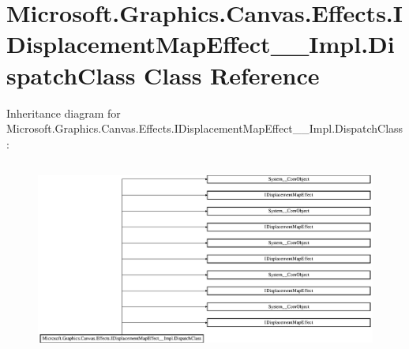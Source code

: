 \hypertarget{class_microsoft_1_1_graphics_1_1_canvas_1_1_effects_1_1_i_displacement_map_effect_____impl_1_1_dispatch_class}{}\section{Microsoft.\+Graphics.\+Canvas.\+Effects.\+I\+Displacement\+Map\+Effect\+\_\+\+\_\+\+Impl.\+Dispatch\+Class Class Reference}
\label{class_microsoft_1_1_graphics_1_1_canvas_1_1_effects_1_1_i_displacement_map_effect_____impl_1_1_dispatch_class}
Inheritance diagram for Microsoft.\+Graphics.\+Canvas.\+Effects.\+I\+Displacement\+Map\+Effect\+\_\+\+\_\+\+Impl.\+Dispatch\+Class\+:\begin{figure}[H]
\begin{center}
\leavevmode
\includegraphics[height=6.443515cm]{class_microsoft_1_1_graphics_1_1_canvas_1_1_effects_1_1_i_displacement_map_effect_____impl_1_1_dispatch_class}
\end{center}
\end{figure}
